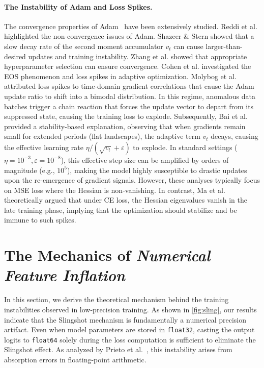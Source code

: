 \documentclass{article}
\theoremstyle{plain}
\theoremstyle{definition}
\theoremstyle{remark}
\begin{document}
\paragraph{The Instability of Adam and Loss Spikes.}
The convergence properties of Adam~\cite{kingma2015} have been extensively studied. 
Reddi et al. \cite{reddi2018} highlighted the non-convergence issues of Adam. 
Shazeer \& Stern \cite{shazeer2018} showed that a slow decay rate of the second moment accumulator $v_t$ can cause larger-than-desired updates and training instability.
Zhang et al. \cite{zhang2022} showed that appropriate hyperparameter selection can ensure convergence. 
Cohen et al. \cite{cohen2023, cohen2025} investigated the EOS phenomenon and loss spikes in adaptive optimization.
Molybog et al. \cite{molybog2023} attributed loss spikes to time-domain gradient correlations 
that cause the Adam update ratio to shift into a bimodal distribution.
In this regime, anomalous data batches trigger a chain reaction 
that forces the update vector to depart from its suppressed state, causing the training loss to explode. 
Subsequently, Bai et al. \cite{bai2025} provided a stability-based explanation, 
observing that when gradients remain small for extended periods (flat landscapes), 
the adaptive term $v_t$ decays, causing the effective learning rate $\eta / (\sqrt{v_t} + \varepsilon)$ to explode. 
In standard settings ($\eta=10^{-3}, \varepsilon=10^{-8}$), 
this effective step size can be amplified by orders of magnitude (e.g., $10^5$), 
making the model highly susceptible to drastic updates upon the re-emergence of gradient signals. 
However, these analyses typically focus on MSE loss where the Hessian is non-vanishing. 
In contrast, Ma et al. \cite{ma2022} theoretically argued that under CE loss, 
the Hessian eigenvalues vanish in the late training phase, implying that the optimization should stabilize and be immune to such spikes.




\section{The Mechanics of \emph{Numerical Feature Inflation}}
\label{sec:theory}
In this section, we derive the theoretical mechanism behind the training instabilities 
observed in low-precision training.
As shown in \cref{fig:sling}, our results indicate that the Slingshot mechanism is fundamentally a numerical precision artifact. 
Even when model parameters are stored in \texttt{float32}, 
casting the output logits to \texttt{float64} solely during the loss computation is sufficient to eliminate the Slingshot effect. 
As analyzed by Prieto et al.~\cite{prieto2025}, this instability arises from absorption errors in floating-point arithmetic.
\end{document}
